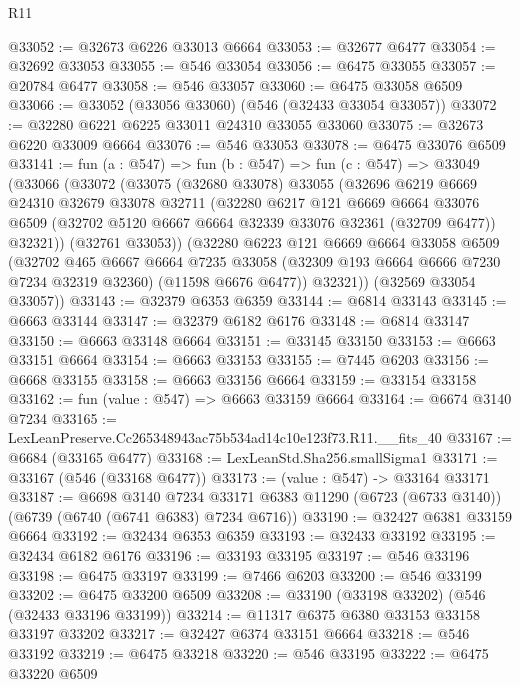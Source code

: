 \begin{lexlean}{R11}
\begin{coremodule}
@33052 := @32673 @6226 @33013 @6664
@33053 := @32677 @6477
@33054 := @32692 @33053
@33055 := @546 @33054
@33056 := @6475 @33055
@33057 := @20784 @6477
@33058 := @546 @33057
@33060 := @6475 @33058 @6509
@33066 := @33052 (@33056 @33060) (@546 (@32433 @33054 @33057))
@33072 := @32280 @6221 @6225 @33011 @24310 @33055 @33060
@33075 := @32673 @6220 @33009 @6664
@33076 := @546 @33053
@33078 := @6475 @33076 @6509
@33141 := fun (a : @547) =>
  fun (b : @547) =>
  fun (c : @547) =>
  @33049
    (@33066
      (@33072
        (@33075
          (@32680 @33078)
          @33055
          (@32696
            @6219
            @6669
            @24310
            @32679
            @33078
            @32711
            (@32280
              @6217
              @121
              @6669
              @6664
              @33076
              @6509
              (@32702 @5120 @6667 @6664 @32339 @33076 @32361 (@32709 @6477))
              @32321))
          (@32761 @33053))
        (@32280
          @6223
          @121
          @6669
          @6664
          @33058
          @6509
          (@32702
            @465
            @6667
            @6664
            @7235
            @33058
            (@32309 @193 @6664 @6666 @7230 @7234 @32319 @32360)
            (@11598 @6676 @6477))
          @32321))
      (@32569 @33054 @33057))
@33143 := @32379 @6353 @6359
@33144 := @6814 @33143
@33145 := @6663 @33144
@33147 := @32379 @6182 @6176
@33148 := @6814 @33147
@33150 := @6663 @33148 @6664
@33151 := @33145 @33150
@33153 := @6663 @33151 @6664
@33154 := @6663 @33153
@33155 := @7445 @6203
@33156 := @6668 @33155
@33158 := @6663 @33156 @6664
@33159 := @33154 @33158
@33162 := fun (value : @547) => @6663 @33159 @6664
@33164 := @6674 @3140 @7234
@33165 := LexLeanPreserve.Cc265348943ac75b534ad14c10e123f73.R11.__fits_40
@33167 := @6684 (@33165 @6477)
@33168 := LexLeanStd.Sha256.smallSigma1
@33171 := @33167 (@546 (@33168 @6477))
@33173 := (value : @547) -> @33164 @33171
@33187 := @6698
    @3140
    @7234
    @33171
    @6383
    @11290
    (@6723 (@6733 @3140))
    (@6739 (@6740 (@6741 @6383) @7234 @6716))
@33190 := @32427 @6381 @33159 @6664
@33192 := @32434 @6353 @6359
@33193 := @32433 @33192
@33195 := @32434 @6182 @6176
@33196 := @33193 @33195
@33197 := @546 @33196
@33198 := @6475 @33197
@33199 := @7466 @6203
@33200 := @546 @33199
@33202 := @6475 @33200 @6509
@33208 := @33190 (@33198 @33202) (@546 (@32433 @33196 @33199))
@33214 := @11317 @6375 @6380 @33153 @33158 @33197 @33202
@33217 := @32427 @6374 @33151 @6664
@33218 := @546 @33192
@33219 := @6475 @33218
@33220 := @546 @33195
@33222 := @6475 @33220 @6509

\end{coremodule}
\end{lexlean}
